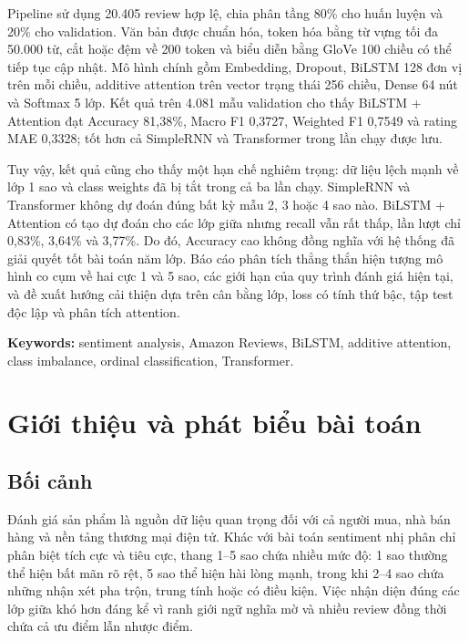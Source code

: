 \documentclass[12pt]{report}
\begin{document}
Pipeline sử dụng 20.405 review hợp lệ, chia phân tầng 80\% cho huấn luyện và
20\% cho validation. Văn bản được chuẩn hóa, token hóa bằng từ vựng tối đa
50.000 từ, cắt hoặc đệm về 200 token và biểu diễn bằng GloVe 100 chiều có thể
tiếp tục cập nhật. Mô hình chính gồm Embedding, Dropout, BiLSTM 128 đơn vị trên
mỗi chiều, additive attention trên vector trạng thái 256 chiều, Dense 64 nút và
Softmax 5 lớp. Kết quả trên 4.081 mẫu validation cho thấy BiLSTM + Attention đạt
Accuracy 81,38\%, Macro F1 0,3727, Weighted F1 0,7549 và rating MAE 0,3328; tốt
hơn cả SimpleRNN và Transformer trong lần chạy được lưu.

Tuy vậy, kết quả cũng cho thấy một hạn chế nghiêm trọng: dữ liệu lệch mạnh về
lớp 1 sao và class weights đã bị tắt trong cả ba lần chạy. SimpleRNN và
Transformer không dự đoán đúng bất kỳ mẫu 2, 3 hoặc 4 sao nào. BiLSTM +
Attention có tạo dự đoán cho các lớp giữa nhưng recall vẫn rất thấp, lần lượt
chỉ 0,83\%, 3,64\% và 3,77\%. Do đó, Accuracy cao không đồng nghĩa với hệ thống
đã giải quyết tốt bài toán năm lớp. Báo cáo phân tích thẳng thắn hiện tượng mô
hình co cụm về hai cực 1 và 5 sao, các giới hạn của quy trình đánh giá hiện tại,
và đề xuất hướng cải thiện dựa trên cân bằng lớp, loss có tính thứ bậc, tập test
độc lập và phân tích attention.

\textbf{Keywords:} sentiment analysis, Amazon Reviews, BiLSTM, additive
attention, class imbalance, ordinal classification, Transformer.



\chapter{Giới thiệu và phát biểu bài toán}

\section{Bối cảnh}

Đánh giá sản phẩm là nguồn dữ liệu quan trọng đối với cả người mua, nhà bán
hàng và nền tảng thương mại điện tử. Khác với bài toán sentiment nhị phân chỉ
phân biệt tích cực và tiêu cực, thang 1--5 sao chứa nhiều mức độ: 1 sao thường
thể hiện bất mãn rõ rệt, 5 sao thể hiện hài lòng mạnh, trong khi 2--4 sao chứa
những nhận xét pha trộn, trung tính hoặc có điều kiện. Việc nhận diện đúng các
lớp giữa khó hơn đáng kể vì ranh giới ngữ nghĩa mờ và nhiều review đồng thời
chứa cả ưu điểm lẫn nhược điểm.
\end{document}
